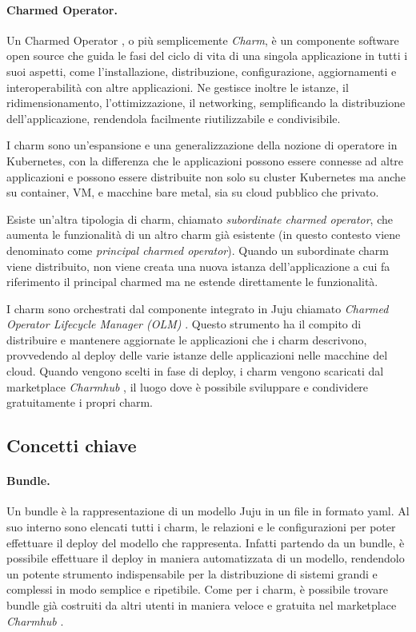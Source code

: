 \paragraph{Charmed Operator.}
Un Charmed Operator \cite{juju_charm}, o più semplicemente \emph{Charm}, è un componente software open source che guida le fasi del ciclo di vita di una singola applicazione in tutti i suoi aspetti, come l'installazione, distribuzione, configurazione, aggiornamenti e interoperabilità con altre applicazioni.
% 
Ne gestisce inoltre le istanze, il ridimensionamento, l'ottimizzazione, il networking, semplificando la distribuzione dell'applicazione, rendendola facilmente riutilizzabile e condivisibile.

I charm sono un'espansione e una generalizzazione della nozione di operatore in Kubernetes, con la differenza che le applicazioni possono essere connesse ad altre applicazioni e possono essere distribuite non solo su cluster Kubernetes ma anche su container, VM, e macchine bare metal, sia su cloud pubblico che privato.

Esiste un'altra tipologia di charm, chiamato \emph{subordinate charmed operator}, che aumenta le funzionalità di un altro charm già esistente (in questo contesto viene denominato come \emph{principal charmed operator}).
Quando un subordinate charm viene distribuito, non viene creata una nuova istanza dell'applicazione a cui fa riferimento il principal charmed ma ne estende direttamente le funzionalità.

\bigskip
I charm sono orchestrati dal componente integrato in Juju chiamato \emph{Charmed Operator Lifecycle Manager (OLM)} \cite{juju_olm} .
% 
Questo strumento ha il compito di distribuire e mantenere aggiornate le applicazioni che i charm descrivono, provvedendo al deploy delle varie istanze delle applicazioni nelle macchine del cloud.
% 
Quando vengono scelti in fase di deploy, i charm vengono scaricati dal marketplace \emph{Charmhub} \cite{charmhub}, il luogo dove è possibile sviluppare e condividere gratuitamente i propri charm.

\subsection{Concetti chiave}\label{subsec:juju_concetti}
\paragraph{Bundle.}
Un bundle \cite{juju_bundle} è la rappresentazione di un modello Juju in un file in formato yaml.
% 
Al suo interno sono elencati tutti i charm, le relazioni e le configurazioni per poter effettuare il deploy del modello che rappresenta.
% 
Infatti partendo da un bundle, è possibile effettuare il deploy in maniera automatizzata di un modello, rendendolo un potente strumento indispensabile per la distribuzione di sistemi grandi e complessi in modo semplice e ripetibile.
% 
Come per i charm, è possibile trovare bundle già costruiti da altri utenti in maniera veloce e gratuita nel marketplace \emph{Charmhub} \cite{charmhub}.

